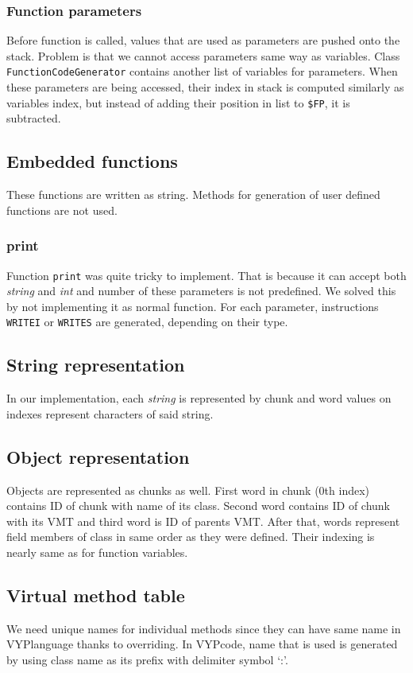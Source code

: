 \documentclass[a4paper, 11pt]{article}
\begin{document}
\subsubsection*{Function parameters}
Before function is called, values that are used as parameters are pushed onto the stack. Problem is that we cannot access parameters same way as variables. Class \texttt{FunctionCodeGenerator} contains another list of variables for parameters. When these parameters are being accessed, their index in stack is computed similarly as variables index, but instead of adding their position in list to \texttt{\$FP}, it is subtracted.

\subsection*{Embedded functions}
These functions are written as string. Methods for generation of user defined functions are not used.

\subsubsection*{print}
Function \texttt{print} was quite tricky to implement. That is because it can accept both \textit{string} and \textit{int} and number of these parameters is not predefined. We solved this by not implementing it as normal function. For each parameter, instructions \texttt{WRITEI} or \texttt{WRITES} are generated, depending on their type.

\subsection{String representation}
In our implementation, each \textit{string} is represented by chunk and word values on indexes represent characters of said string.

\subsection{Object representation}
Objects are represented as chunks as well. First word in chunk (0th index) contains ID of chunk with name of its class. Second word contains ID of chunk with its VMT and third word is ID of parents VMT. After that, words represent field members of class in same order as they were defined. Their indexing is nearly same as for function variables.

\subsection{Virtual method table}
We need unique names for individual methods since they can have same name in VYPlanguage thanks to overriding. In VYPcode, name that is used is generated by using class name as its prefix with delimiter symbol `:'.
\end{document}
